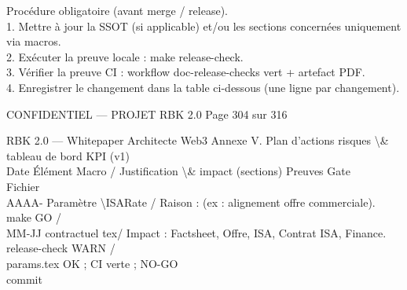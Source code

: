 \documentclass[12pt,landscape,a4paper]{article}
\newenvironment{confidential}
{\begin{tcolorbox}[
    colback=rbkred!5!white,
    colframe=rbkred!75!black,
    title=CONFIDENTIEL,
    fonttitle=\bfseries\color{white},
    coltitle=rbkred!75!black,
    breakable,
    enhanced,
    frame hidden,
    borderline west={2pt}{0pt}{rbkred!75!black}
]}
{\end{tcolorbox}}
\begin{document}
\vspace{0.5em}
Procédure obligatoire (avant merge / release).\\
\vspace{0.5em}
1. Mettre à jour la SSOT (si applicable) et/ou les sections concernées uniquement via macros.\\
\vspace{0.5em}
2. Exécuter la preuve locale : make release-check.\\
\vspace{0.5em}
3. Vérifier la preuve CI : workflow doc-release-checks vert + artefact PDF.\\
\vspace{0.5em}
4. Enregistrer le changement dans la table ci-dessous (une ligne par changement).\\
\vspace{0.5em}
\vspace{0.5em}
\vspace{0.5em}
\vspace{0.5em}
\begin{confidential}CONFIDENTIEL — PROJET RBK 2.0                                                                Page 304 sur 316\end{confidential}
RBK 2.0 — Whitepaper Architecte Web3                                                                                     Annexe V. Plan d’actions risques \textbackslash{}& tableau de bord KPI (v1)\\
\vspace{0.5em}
\vspace{0.5em}
\vspace{0.5em}
Date           Élément               Macro /               Justification \textbackslash{}& impact (sections)                                                             Preuves        Gate\\
Fichier\\
AAAA-          Paramètre             \textbackslash{}ISARate /            Raison : (ex : alignement offre commerciale).                                                 make            GO /\\
MM-JJ          contractuel           tex/                  Impact : Factsheet, Offre, ISA, Contrat ISA, Finance.                                         release-check WARN /\\
params.tex                                                                                                          OK ; CI verte ; NO-GO\\
commit\\
\end{document}
